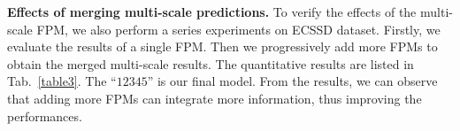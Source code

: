 \documentclass[journal]{IEEEtran}
\begin{document}
\textbf{Effects of merging multi-scale predictions.} To verify the effects of the multi-scale FPM, we also perform a series experiments on ECSSD dataset.
%
Firstly, we evaluate the results of a single FPM.
%
Then we progressively add more FPMs to obtain the merged multi-scale results.
%
The quantitative results are listed in Tab.~\ref{table3}.
%
The ``$12345$” is our final model. From the results, we can observe that adding more FPMs can integrate more information, thus improving the performances.
\begin{table}[thp]
\begin{center}
\caption{Quantitative results of merging multi-scale predictions.}
\label{table3}
\vspace{-6mm}
\end{center}
\end{table}
\end{document}
